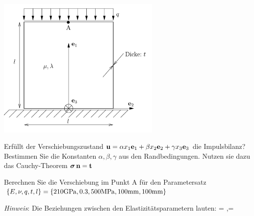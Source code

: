 \begin{center}
\includegraphics[width=0.6\textwidth]{fig/ue1_cube_surface_load_on_plane.pdf}
\end{center}


\enab
\item Erfüllt der Verschiebungszustand 
${{\bm{\mathrm{u}}}}= \alpha x_1 {{\bm{\mathrm{e}}}}_1 + \beta x_2 {{\bm{\mathrm{e}}}}_2 + \gamma x_3 {{\bm{\mathrm{e}}}}_3$
die Impulsbilanz? 
Bestimmen Sie die Konstanten $\alpha, \beta, \gamma$ aus den Randbedingungen.
Nutzen sie dazu das Cauchy-Theorem ${\bm{\sigma }} \, {{\bm{\mathrm{n}}}}={{\bm{\mathrm{t}}}}$

\item Berechnen Sie die Verschiebung im Punkt A für den Parametersatz $\{E,\nu,q,t,l\}=\{210 \mathrm{GPa},0.3,500 \mathrm{MPa},100 \mathrm{mm} ,100 \mathrm{mm}\}$ 

\par \textit{Hinweis}: Die Beziehungen zwischen den Elastizitätsparametern lauten: 
\ebn \lambda= \quad,\quad \mu= \een


\enae